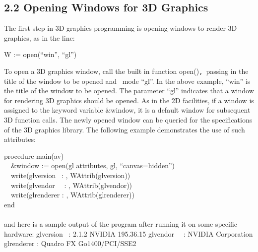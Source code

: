 \documentclass[letterpaper]{article}
\begin{document}
\subsection[2.2 Opening Windows for 3D Graphics]
{2.2 Opening Windows for 3D Graphics}


{
The first step in 3D graphics programming is opening windows to render 3D graphics, as in the line: }


\bigskip

{\sffamily
W := open(``win'', ``gl'')}


\bigskip

{
To open a 3D graphics window, call the built in function \textsf{open()}\texttt{, }passing in the title of the window to
be opened and \ mode \textsf{{}``gl''}. In the above example, \textsf{{}``win''} is the title of the window to be
opened. The parameter \textsf{{}``gl''} indicates that a window for rendering 3D graphics should be opened. As in the
2D facilities, if a window is assigned to the keyword variable \textsf{\&window}, it is a default window for subsequent
3D function calls. The newly opened window can be queried for the specifications of the 3D graphics library. The
following example demonstrates the use of such attributes:}

{
\textsf{procedure main(av)\\
 \ \ \&window := open({\textquotedbl}gl attributes{\textquotedbl}, {\textquotedbl}gl{\textquotedbl},
``canvas=hidden'')\\
 \ \ write({\textquotedbl}glversion \ : {\textquotedbl}, WAttrib({\textquotedbl}glversion{\textquotedbl}))\\
 \ \ write({\textquotedbl}glvendor \ \ : {\textquotedbl}, WAttrib({\textquotedbl}glvendor{\textquotedbl}))\\
 \ \ write({\textquotedbl}glrenderer : {\textquotedbl}, WAttrib({\textquotedbl}glrenderer{\textquotedbl}))\\
end\\
}\\
and here is a sample output of the program after running it on some specific hardware:\newline
\newline
\textsf{glversion \ : 2.1.2 NVIDIA 195.36.15\newline
glvendor \ \ : NVIDIA Corporation\newline
glrenderer : Quadro FX Go1400/PCI/SSE2}\newline
}
\end{document}
